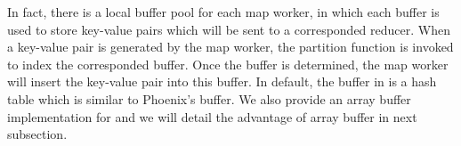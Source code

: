 In fact, there is a local buffer pool for each map worker, in which each buffer is used to store key-value  pairs which will be sent to a corresponded reducer.
When a key-value pair is generated by the map worker, the partition function is invoked to index the corresponded buffer.
Once the buffer is determined, the map worker will insert the key-value pair into this buffer.
In default, the buffer in \myds is a hash table which is similar to Phoenix's buffer.
We also provide an array buffer implementation for \myds and we will detail the advantage of array buffer in next subsection.







%



